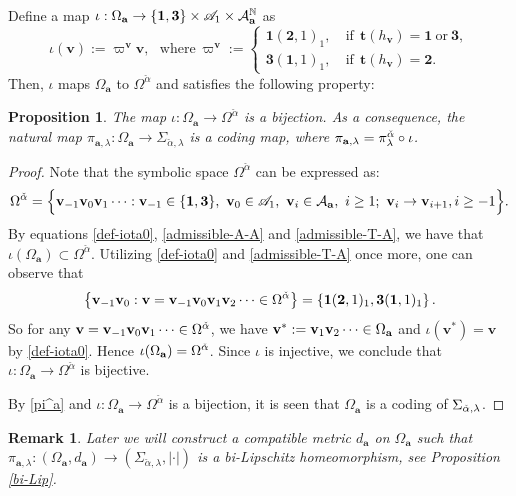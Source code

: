 \documentclass[reqno,11pt,graphicx,]{amsart}
\numberwithin{equation}{section}
\theoremstyle{plain}
\newcommand{\3}{\mathbf{3}}
\newcommand{\ma}{\mathbf{a}}
\newcommand{\mv}{\mathbf{v}}
\newtheorem{proposition}[theorem]{Proposition}
\newtheorem{remark}[theorem]{Remark}
\begin{document}
	Define a map $\iota :\Omega _{%
		\mathbf{a}}\rightarrow \{\mathbf{1},\mathbf{3}\}\times \mathscr{A}_{1}\times %
	\mathcal{A}_{\mathbf{a}}^{{\mathbb{N}}}$ as 
	\begin{equation}\label{def-iota0}
		\iota(\mathbf{v}):=\varpi^{\mv}\mv,\ \ \ \text{where}\ \varpi^{\mv}:=\begin{cases}
			\mathbf{1}(\mathbf{2},1)_{1},\  & \mbox{if}\ \ \mathbf{t}(h_{\mv})=\mathbf{1}\ \text{or}\ \mathbf{3}, \\ 
			\mathbf{3}(\mathbf{1},1)_{1},\  & \mbox{if}\ \ \mathbf{t}(h_{\mv})=\mathbf{2}.%
		\end{cases}%
	\end{equation}
	Then, $\iota$ maps $\Omega_{\ma}$ to $\Omega^{\check{\alpha}}$  and satisfies the following property:
	
	\begin{proposition}\label{Omega-Sigma} 
		The map $\iota:\Omega_{\ma}\to\Omega^{\check{\alpha}}$ is
		a bijection. As a consequence, the natural map  $\pi_{\ma,\lambda}:\Omega_{\ma}\to\Sigma_{\check{\alpha},\lambda}$ is a coding map, where $\pi_{\ma,\lambda}=\pi^{\check{%
				\alpha}}_{\lambda}\circ\iota$.
	\end{proposition}
	
	\begin{proof}
		Note that the symbolic space $\Omega^{\check{\alpha}}$ can be expressed as: 
		\begin{eqnarray*}
			\Omega^{\check{\alpha}}=\Big\{\mv_{-1}\mathbf{v}_0\mathbf{v}_1\cdots: \mathbf{v}_{-1}\in \{\mathbf{1},\mathbf{3}\},\
			\mv_0\in\mathscr{A}_{1},\ \mathbf{v}_{i}\in{%
				\mathcal A}_{\mathbf{a}},\ i\geq 1;\ \mathbf{v}_i\to \mathbf{v}%
			_{i+1}, i\ge-1\Big\}.
		\end{eqnarray*}
		By equations \eqref{def-iota0}, \eqref{admissible-A-A} and \eqref{admissible-T-A}, we have that $\iota(\Omega_{\mathbf{a}})\subset \Omega^{\check{\alpha}}$. Utilizing \eqref{def-iota0} and %
		\eqref{admissible-T-A} once more, one can observe that 
		\begin{equation*}
			\left\{\mv_{-1}\mv_{0}:\mv=\mv_{-1}\mv_0\mv_1\mv_2\cdots\in\Omega^{%
				\check{\alpha}}\right\}=\left\{\mathbf{1}(\mathbf{2},1)_1,\mathbf{3}(\mathbf{%
				1},1)_1\right\}.
		\end{equation*}
		So for any $\mv=\mv_{-1}\mv_0\mv_1\cdots\in \Omega^{\check{%
				\alpha}}$, we have $\mv^*:=\mv_1\mv_2\cdots\in \Omega_{%
			\mathbf{a}}$ and $\iota(\mv^*)=\mv$ by \eqref{def-iota0}. Hence $\iota(\Omega_{%
			\mathbf{a}})=\Omega^{\check{\alpha}}$. Since $\iota$ is injective, we
		conclude that $\iota: \Omega _{\mathbf{a}}\to \Omega^{\check{\alpha}}$ is
		bijective.
		
		By \eqref{pi^a} and $\iota:\Omega _{\mathbf{a}}\to\Omega^{\check{\alpha}}$ is
		a bijection, it is seen that $\Omega_{\ma}$ is a coding of $\Sigma_{%
			\check{\alpha},\lambda}$.
	\end{proof}
	\begin{remark}
		Later we will construct a compatible metric $d_{\ma}$ on $\Omega_{\ma}$ such that
		$\pi_{\ma,\lambda}:(\Omega_{\ma},d_{\ma})\to(\Sigma_{\check{\alpha},\lambda},|\cdot|)$ is a bi-Lipschitz homeomorphism, see Proposition \ref{bi-Lip}.
	\end{remark}
	
\end{document}
